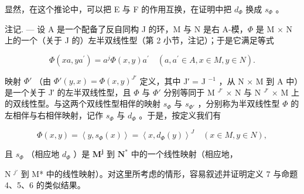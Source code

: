显然，在这个推论中，可以把 E 与 F 的作用互换，在证明中把 \(d_{\Phi}\) 换成 \(s_{\Phi}\) 。

注记. --- 设 A 是一个配备了反自同构 J 的环，M 与 N 是右 A-模，\(\Phi\) 是 M × N 上的一个（关于 J 的）左半双线性型（第 2 小节，注记）；于是它满足等式

\[
\Phi (x a, y a ^ {\prime}) = a ^ {j} \Phi (x, y) a ^ {\prime} \quad (a, a ^ {\prime} \in A, x \in M, y \in N).
\]

映射 \(\Phi'\) （由 \(\Phi'(y, x) = \Phi(x, y)^{J'}\) 定义，其中 J′ = J \(^{-1}\) ，从 N × M 到 A 中）是一个关于 J′ 的左半双线性型，且 \(\Phi\) 与 \(\Phi'\) 分别等同于 M \(^{J'}\) × N 与 N \(^{J'}\) × M 上的双线性型。与这两个双线性型相伴的映射 \(s_{\Phi}\) 与 \(s_{\Phi'}\) ，分别称为半双线性型 \(\Phi\) 的左相伴与右相伴映射，记作 \(s_{\Phi}\) 与 \(d_{\Phi}\) 。于是，按定义我们有

\[
\Phi (x, y) = \left\langle y, s _ {\Phi} (x) \right\rangle = \left\langle x, d _ {\Phi} (y) \right\rangle^ {J} \quad (x \in M, y \in N),\tag{26}
\]

且 \(s_{\Phi}\) （相应地 \(d_{\Phi}\) ）是 \(\mathbf{M}^{\mathbf{j}}\) 到 \(\mathbf{N}^{*}\) 中的一个线性映射（相应地，

N \(^{j'}\) 到 M* 中的线性映射）。对这里所考虑的情形，容易叙述并证明定义 7 与命题 4、5、6 的类似结果。

